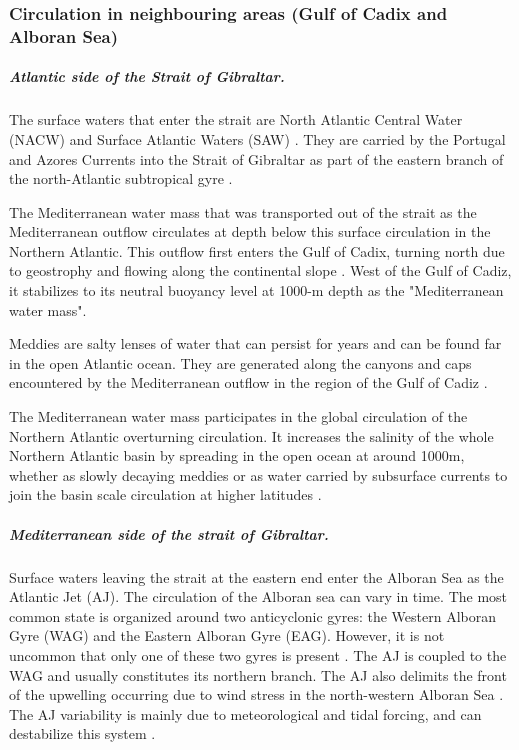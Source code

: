 \subsubsection{Circulation in neighbouring areas (Gulf of Cadix and Alboran Sea)}

\subparagraph{Atlantic side of the Strait of Gibraltar.}

The surface waters that enter the strait are North Atlantic Central Water (NACW) and Surface Atlantic Waters (SAW) \citep{Millot2014,Naranjo2015}. They are carried by the Portugal and Azores Currents into the Strait of Gibraltar as part of the eastern branch of the north-Atlantic subtropical gyre \citep{barton_2001}.

The Mediterranean water mass that was transported out of the strait as the Mediterranean outflow circulates at depth below this surface circulation in the Northern Atlantic. This outflow first enters the Gulf of Cadix, turning north due to geostrophy and flowing along the continental slope \citep{price_1993,gasser_2017}. West of the Gulf of Cadiz, it stabilizes to its neutral buoyancy level at 1000-m depth as the "Mediterranean water mass"\citep{price_1993}.

Meddies are salty lenses of water that can persist for years and can be found far in the open Atlantic ocean. They are generated along the canyons and caps encountered by the Mediterranean outflow in the region of the Gulf of Cadiz \citep{bashmachnikov_2015}. 

The Mediterranean water mass participates in the global circulation of the Northern Atlantic overturning circulation. It increases the salinity of the whole Northern Atlantic basin by spreading in the open ocean at around 1000m, whether as slowly decaying meddies or as water carried by subsurface currents to join the basin scale circulation at higher latitudes \citep{price_1993,jia_2007}.

\subparagraph{Mediterranean side of the strait of Gibraltar.} 

Surface waters leaving the strait at the eastern end enter the Alboran Sea as the Atlantic Jet (AJ). The circulation of the Alboran sea can vary in time. The most common state is organized around two anticyclonic gyres: the Western Alboran Gyre (WAG) and the Eastern Alboran Gyre (EAG). However, it is not uncommon that only one of these two gyres is present \citep{heburn_1990}. The AJ is coupled to the WAG and usually constitutes its northern branch. The AJ also delimits the front of the upwelling occurring due to wind stress in the north-western Alboran Sea \citep{sarhan_2000}. The AJ variability is mainly due to meteorological and tidal forcing, and can destabilize this system \citep{sanchez-garrido_2013,lorente_2019}.

